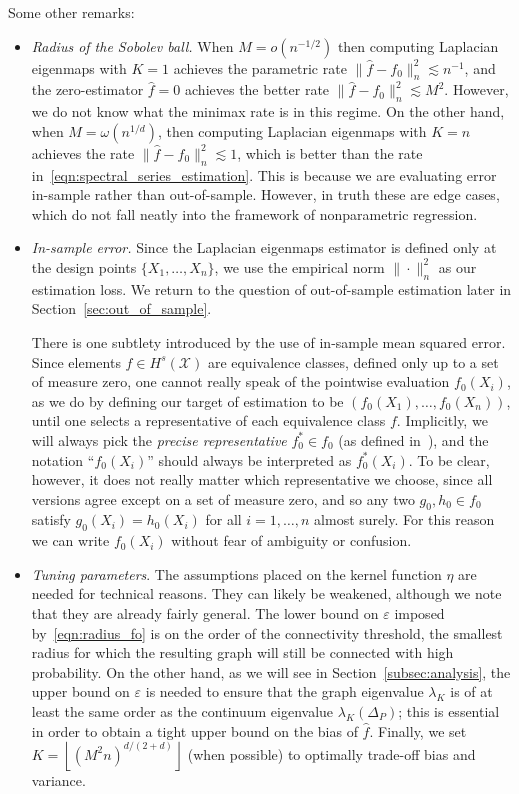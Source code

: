 \documentclass[aos]{imsart}
\theoremstyle{plain}
\theoremstyle{definition}
\theoremstyle{remark}
\newcommand{\wh}[1]{\widehat{#1}}
\newcommand{\mc}[1]{\mathcal{#1}}
\newcommand{\floor}[1]{\left\lfloor #1 \right\rfloor}
\newcommand{\1}{\mathbf{1}}
\begin{document}
Some other remarks:
\begin{itemize}
	\item \emph{Radius of the Sobolev ball.} 
	When $M = o(n^{-1/2})$ then computing Laplacian eigenmaps with $K = 1$ achieves the parametric rate $\|\wh{f} - f_0\|_n^2 \lesssim n^{-1}$, and the zero-estimator $\wh{f} = 0$ achieves the better rate $\|\wh{f} - f_0\|_n^2 \lesssim M^2$. However, we do not know what the minimax rate is in this regime. On the other hand, when $M = \omega(n^{1/d})$, then computing Laplacian eigenmaps with $K = n$ achieves the rate $\|\wh{f} - f_0\|_n^2 \lesssim 1$, which is better than the rate in~\eqref{eqn:spectral_series_estimation}. This is because we are evaluating error in-sample rather than out-of-sample. However, in truth these are edge cases, which do not fall neatly into the framework of nonparametric regression. 
	
	\item \emph{In-sample error.} Since the Laplacian eigenmaps estimator is defined only at the design points $\{X_1,\ldots,X_n\}$, we use the empirical norm $\|\cdot\|_n^2$ as our estimation loss. We return to the question of out-of-sample estimation later in Section~\ref{sec:out_of_sample}. 
	
	There is one subtlety introduced by the use of in-sample mean squared error. Since elements $f \in H^s(\mc{X})$ are equivalence classes, defined only up to a set of measure zero, one cannot really speak of the pointwise evaluation $f_0(X_i)$, as we do by defining our target of estimation to be $(f_0(X_1),\ldots,f_0(X_n))$, until one selects a representative of each equivalence class $f$. Implicitly, we will always pick the \emph{precise representative} $f_0^{\ast} \in f_0$ (as defined in~\cite{evans15}), and the notation ``$f_0(X_i)$'' should always be interpreted as $f_0^{\ast}(X_i)$. To be clear, however, it does not really matter which representative we choose, since all versions agree except on a set of measure zero, and so any two $g_0,h_0 \in f_0$ satisfy $g_0(X_i) = h_0(X_i)$ for all $i = 1,\ldots,n$ almost surely. For this reason we can write $f_0(X_i)$ without fear of ambiguity or confusion. 
	
	\item \emph{Tuning parameters}. The assumptions placed on the kernel function $\eta$ are needed for technical reasons. They can likely be weakened, although we note that they are already fairly general. The lower bound on $\varepsilon$ imposed by~\eqref{eqn:radius_fo} is on the order of the connectivity threshold, the smallest radius for which the resulting graph will still be connected with high probability. On the other hand, as we will see in Section~\ref{subsec:analysis}, the upper bound on $\varepsilon$ is needed to ensure that the graph eigenvalue $\lambda_K$ is of at least the same order as the continuum eigenvalue $\lambda_K(\Delta_P)$; this is essential in order to obtain a tight upper bound on the bias of $\wh{f}$.  Finally, we set $K = \floor{(M^2n)^{d/(2 + d)}}$ (when possible) to optimally trade-off bias and variance.
	

\end{itemize}
\end{document}
